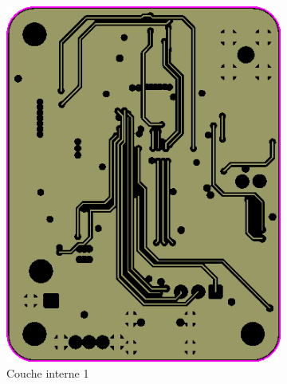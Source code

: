 \documentclass{article}
\begin{document}
\begin{figure}[h!]
\begin{subfigure}{0.40\textwidth}
        \includegraphics[width=\textwidth]{image/Inner1.png}
        \caption{Couche interne 1}
        \label{fig:apex_inner1}
    \end{subfigure}
    \begin{subfigure}{0.40\textwidth}
        \centering

\end{subfigure}
\end{figure}
\end{document}
